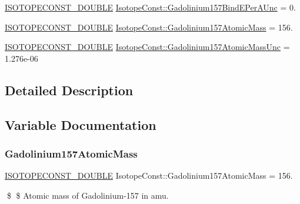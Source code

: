 \begin{DoxyCompactItemize}
\item 
\mbox{\hyperlink{group___isotope_const-_macros_ga8f45a7272ce02c0b4c65c44636ed719a}{I\+S\+O\+T\+O\+P\+E\+C\+O\+N\+S\+T\+\_\+\+D\+O\+U\+B\+LE}} \mbox{\hyperlink{group___isotope_const-_gadolinium-_gd157_ga14a42caefb23181826dc42e573dfe448}{Isotope\+Const\+::\+Gadolinium157\+Bind\+E\+Per\+A\+Unc}} = 0.
\item 
\mbox{\hyperlink{group___isotope_const-_macros_ga8f45a7272ce02c0b4c65c44636ed719a}{I\+S\+O\+T\+O\+P\+E\+C\+O\+N\+S\+T\+\_\+\+D\+O\+U\+B\+LE}} \mbox{\hyperlink{group___isotope_const-_gadolinium-_gd157_ga09ffd90c2bbc7b92138d48e085964f8c}{Isotope\+Const\+::\+Gadolinium157\+Atomic\+Mass}} = 156.
\item 
\mbox{\hyperlink{group___isotope_const-_macros_ga8f45a7272ce02c0b4c65c44636ed719a}{I\+S\+O\+T\+O\+P\+E\+C\+O\+N\+S\+T\+\_\+\+D\+O\+U\+B\+LE}} \mbox{\hyperlink{group___isotope_const-_gadolinium-_gd157_ga9c66d848334aa2491e770df60619f14b}{Isotope\+Const\+::\+Gadolinium157\+Atomic\+Mass\+Unc}} = 1.\+276e-\/06
\end{DoxyCompactItemize}


\subsection{Detailed Description}


\subsection{Variable Documentation}
\mbox{\label{group___isotope_const-_gadolinium-_gd157_ga09ffd90c2bbc7b92138d48e085964f8c}} 
\subsubsection{\texorpdfstring{Gadolinium157\+Atomic\+Mass}{Gadolinium157AtomicMass}}
{\footnotesize\ttfamily \mbox{\hyperlink{group___isotope_const-_macros_ga8f45a7272ce02c0b4c65c44636ed719a}{I\+S\+O\+T\+O\+P\+E\+C\+O\+N\+S\+T\+\_\+\+D\+O\+U\+B\+LE}} Isotope\+Const\+::\+Gadolinium157\+Atomic\+Mass = 156.}

\$ \$ Atomic mass of Gadolinium-\/157 in amu. \mbox{\label{group___isotope_const-_gadolinium-_gd157_ga9c66d848334aa2491e770df60619f14b}} 
